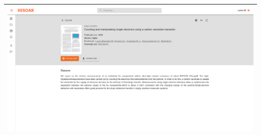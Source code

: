 \begin{table}[H]
\begin{tabular}{|p{1cm}|p{14cm}|}
        \multicolumn{2}{|c|}{\includegraphics[scale=0.294]{img/resoar-view-research.png}}                                                                                                                                                                                                                                                                                                                                                        \\ \hline
    \end{tabular}
\end{table}

